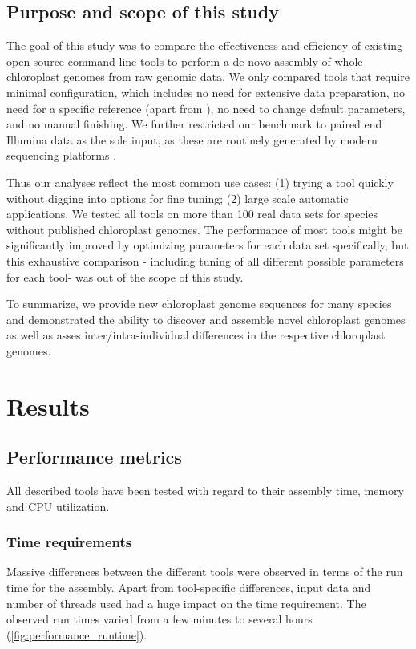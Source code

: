 \documentclass{bmcart}
\begin{document}
\subsection*{Purpose and scope of this study}
The goal of this study was to compare the effectiveness and efficiency of existing open source command-line tools to perform a de-novo assembly of whole chloroplast genomes from raw genomic data.
We only compared tools that require minimal configuration, which includes no need for extensive data preparation, no need for a specific reference (apart from ), no need to change default parameters, and no manual finishing.
We further restricted our benchmark to paired end Illumina data as the sole input, as  these are routinely generated by modern sequencing platforms \cite{Goodwin2016}. 

Thus our analyses reflect the most common use cases: (1) trying a tool quickly without digging into options for fine tuning; (2) large scale automatic applications.
We tested all tools on more than \num{100} real data sets for species without published chloroplast genomes.
The performance of most tools might be significantly improved by optimizing parameters for each data set specifically, but this exhaustive comparison - including tuning of all different possible parameters for each tool- was out of the scope of this study. 

To summarize, we provide new chloroplast genome sequences for many species and demonstrated the ability to discover and assemble novel chloroplast genomes as well as asses inter/intra-individual differences in the respective chloroplast genomes.

\section*{Results}
\subsection*{Performance metrics}
All described tools have been tested with regard to their assembly time, memory and CPU utilization.

\subsubsection*{Time requirements}
Massive differences between the different tools were observed in terms of the run time for the assembly. Apart from tool-specific differences, input data and number of threads used had a huge impact on the time requirement. The observed run times varied from a few minutes to several hours (\cref{fig:performance_runtime}).
\end{document}
